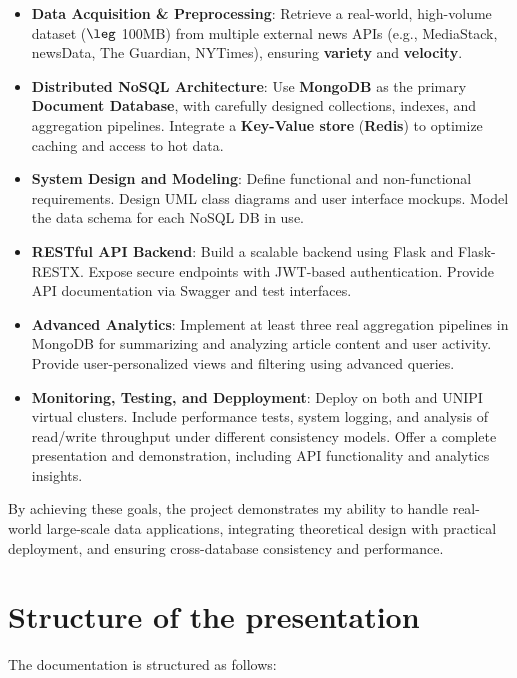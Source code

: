 \begin{itemize}
    \item \textbf{Data Acquisition \& Preprocessing}: Retrieve a real-world, high-volume dataset ($\leg$ 100MB) from multiple external news APIs (e.g., MediaStack, newsData, The Guardian, NYTimes), ensuring \textbf{variety} and \textbf{velocity}.
    \item \textbf{Distributed NoSQL Architecture}: Use \textbf{MongoDB}\cite{mongodb} as the primary \textbf{Document Database}, with carefully designed collections, indexes, and aggregation pipelines.
    Integrate a \textbf{Key-Value store} (\textbf{Redis}\cite{redis}) to optimize caching and access to hot data.
    \item \textbf{System Design and Modeling}: Define functional and non-functional requirements.
    Design UML class diagrams and user interface mockups.
    Model the data schema for each NoSQL DB in use.
    \item \textbf{RESTful API Backend}: Build a scalable backend using Flask\cite{flask} and Flask-RESTX\cite{flaskrestx}.
    Expose secure endpoints with JWT-based authentication.
    Provide API documentation via Swagger and test interfaces.
    \item \textbf{Advanced Analytics}: Implement at least three real aggregation pipelines in MongoDB for summarizing and analyzing article content and user activity.
    Provide user-personalized views and filtering using advanced queries.
    \item \textbf{Monitoring, Testing, and Depployment}: Deploy on both and UNIPI virtual clusters\cite{docker}.
    Include performance tests, system logging, and analysis of read/write throughput under different consistency models.
    Offer a complete presentation and demonstration, including API functionality and analytics insights.
\end{itemize}

By achieving these goals, the project demonstrates my ability to handle real-world large-scale data applications,
integrating theoretical design with practical deployment, and ensuring cross-database consistency and performance.


\section{Structure of the presentation}\label{sec:structure-of-the-presentation}

The documentation is structured as follows:

